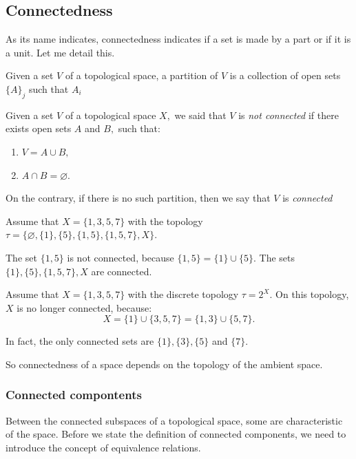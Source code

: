 \documentclass[
	fontsize=10pt, %
	twoside=false, %
	secnumdepth=1, %
]{kaobook}
\begin{document}
\subsection{Connectedness}

As its name indicates, connectedness indicates if a set is made by a part or if it is a unit. Let me detail this. 

\begin{definition}
Given a set $V$ of a topological space, a partition of $V$ is a collection of open sets $\{A\}_j$ such that $A_i$
\end{definition}

\begin{definition}
Given a set $V$ of a topological space $X,$ we said that $V$ is \emph{not connected} if there exists open sets $A$ and $B,$ such that:
\begin{enumerate}
\item $V=A\cup B,$
\item $A\cap B =\varnothing.$
\end{enumerate}

On the contrary, if there is no such partition, then we say that $V$ is \emph{connected}
\end{definition}

\begin{example}
Assume that $X=\{1,3,5,7\}$ with the topology $\tau=\{\varnothing,\{1\},\{5\},\{1,5\},\{1,5,7\},X\}.$ 

The set $\{1,5\}$ is not connected, because $\{1,5\}=\{1\}\cup\{5\}.$ The sets $\{1\},\{5\},\{1,5,7\}, X$ are connected. 
\end{example}

\begin{example}
Assume that $X=\{1,3,5,7\}$ with the discrete topology $\tau=2^X.$ On this topology, $X$ is no longer connected, because: $$X=\{1\}\cup\{3,5,7\}=\{1,3\}\cup\{5,7\}.$$

In fact, the only connected sets are $\{1\},\{3\},\{5\}$ and $\{7\}.$
\end{example}

So connectedness of a space depends on the topology of the ambient space. 

\subsubsection{Connected compontents}

Between the connected subspaces of a topological space, some are characteristic of the space. Before we state the definition of connected components, we need to introduce the concept of equivalence relations.
\end{document}
